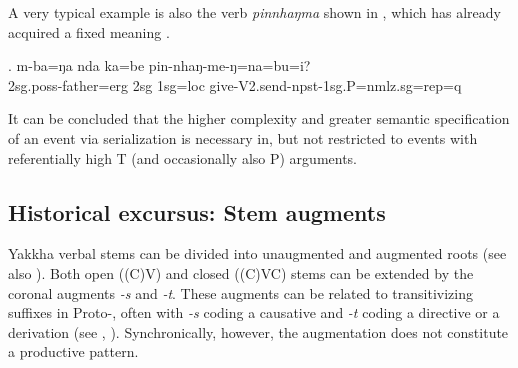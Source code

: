 A very typical example is also the verb \emph{pinnhaŋma}  shown in \Next, which has already acquired a fixed meaning .

\exg. m-ba=ŋa nda ka=be pin-nhaŋ-me-ŋ=na=bu=i?\\
{\sc 2sg.poss}-father{\sc =erg} {\sc 2sg} {\sc 1sg=loc}	give{\sc -V2.send-npst-1sg.P=nmlz.sg=rep=q}\\

	
It can be concluded that the higher complexity and greater semantic specification of an event via serialization is necessary in, but not restricted to events with referentially high T (and occasionally also P) arguments.
	
\subsection{Historical excursus: Stem augments}\label{stemchange}
\largerpage
Yakkha verbal stems can be divided into unaugmented and augmented roots (see also ). Both open ((C)V) and closed ((C)VC) stems can be extended by the coronal augments \emph{-s} and \emph{-t}. These augments can be related to transitivizing suffixes in Proto-, often with \emph{-s} coding a causative and \emph{-t} coding a directive or a  derivation (see \citealt[457]{Matisoff2003Handbook}, \citealt[160]{Driem1989_Reflexes}). Synchronically, however, the augmentation does not constitute a productive pattern. 

